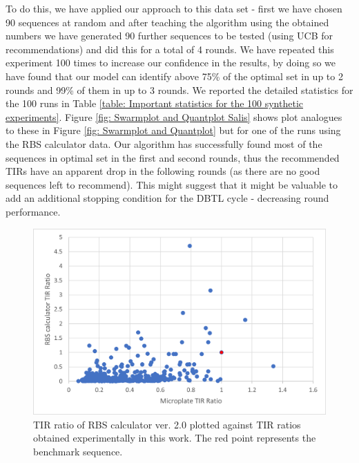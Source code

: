 \documentclass{scrartcl}[2013/05/29]%
\begin{document}
To do this, we have applied our approach to this data set - first we have chosen 90 sequences at random and after teaching the algorithm using the obtained numbers we have generated 90 further sequences to be tested (using UCB for recommendations) and did this for a total of 4 rounds.
We have repeated this experiment 100 times to increase our confidence in the results, by doing so we have found that our model can identify above 75\% of the optimal set in up to 2 rounds and 99\% of them in up to 3 rounds.
We reported the detailed statistics for the 100 runs in Table \mbox{\ref{table: Important statistics for the 100 synthetic experiments}}.
Figure \mbox{\ref{fig: Swarmplot and Quantplot Salis}} shows plot analogues to these in Figure \mbox{\ref{fig: Swarmplot and Quantplot}}  but for one of the runs using the RBS calculator data.
Our algorithm has successfully found most of the sequences in optimal set in the first and second rounds, thus the recommended TIRs have an apparent drop in the following rounds (as there are no good sequences left to recommend).
This might suggest that it might be valuable to add an additional stopping condition for the DBTL cycle - decreasing round performance.

\begin{figure}
    \centering
    \includegraphics[scale = 0.6]{paper/plots/Supplementary/TIR_ratio_salis_micro.png}
    \caption{TIR ratio of RBS calculator ver. 2.0 \cite{Salis2009} plotted against TIR ratios obtained experimentally in this work. The red point represents the benchmark sequence.}
    \label{fig:TIR ratio salis micro}
\end{figure}
\end{document}
